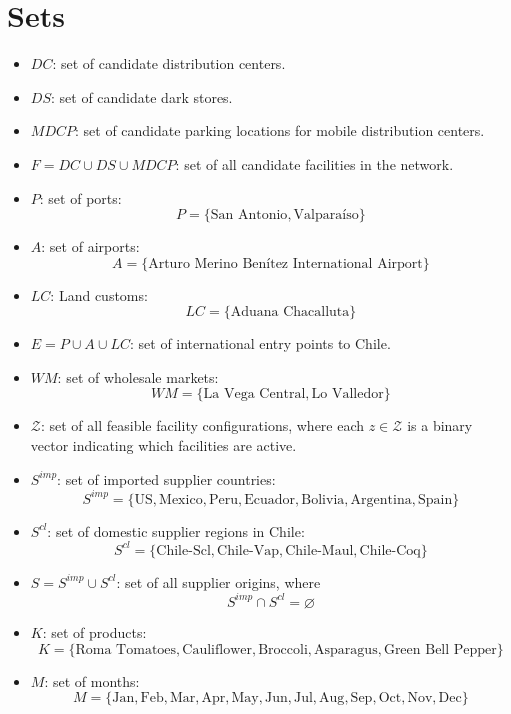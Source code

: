 \documentclass[12pt]{article}
\begin{document}
\section{Sets}
\begin{itemize}
    \item $DC$: set of candidate distribution centers.
    
    \item $DS$: set of candidate dark stores.
    
    \item $MDCP$: set of candidate parking locations for mobile distribution centers.
    
    \item $F = DC \cup DS \cup MDCP$: set of all candidate facilities in the network.
    
    \item $P$: set of ports:
    \[
    P = \{\text{San Antonio}, \text{Valparaíso}\}
    \]
    
    \item $A$: set of airports:
    \[
    A = \{\text{Arturo Merino Benítez International Airport}\}
    \]

    \item $LC$: Land customs:
    \[
    LC = \{\text{Aduana Chacalluta}\}
    \]

    \item $E = P \cup A \cup  LC$: set of international entry points to Chile.
    
    \item $WM$: set of wholesale markets:
    \[
    WM = \{\text{La Vega Central}, \text{Lo Valledor}\}
    \]
    
    \item $\mathcal{Z}$: set of all feasible facility configurations, where each $z \in \mathcal{Z}$ is a binary vector indicating which facilities are active.
    
     \item $S^{imp}$: set of imported supplier countries:
    \[
    S^{imp} = \{\mathrm{US}, \mathrm{Mexico}, \mathrm{Peru}, \mathrm{Ecuador}, \mathrm{Bolivia}, \mathrm{Argentina}, \mathrm{Spain}\}
    \]

    \item $S^{cl}$: set of domestic supplier regions in Chile:
    \[
    S^{cl} = \{\mathrm{Chile\text{-}Scl}, \mathrm{Chile\text{-}Vap}, \mathrm{Chile\text{-}Maul}, \mathrm{Chile\text{-}Coq}\}
    \]

    \item $S = S^{imp} \cup S^{cl}$: set of all supplier origins, where
    \[
    S^{imp} \cap S^{cl} = \varnothing
    \]

    \item $K$: set of products:
    \[
    K = \{\text{Roma Tomatoes}, \text{Cauliflower}, \text{Broccoli}, \text{Asparagus}, \text{Green Bell Pepper}\}
    \]

    \item $M$: set of months:
    \[
    M = \{\text{Jan}, \text{Feb}, \text{Mar}, \text{Apr}, \text{May}, \text{Jun}, \text{Jul}, \text{Aug}, \text{Sep}, \text{Oct}, \text{Nov}, \text{Dec}\}
    \]
\end{itemize}
\end{document}
